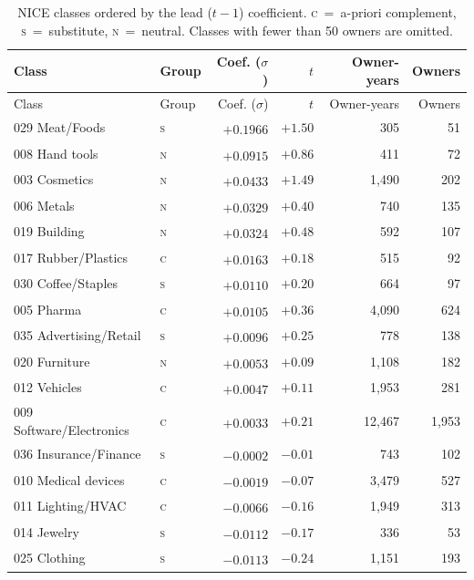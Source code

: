 \documentclass[11pt]{article}
\begin{document}
\begin{longtable}{llrrrr}
\caption{NICE classes ordered by the lead ($t-1$) coefficient. \textsc{c}~=~a-priori complement, \textsc{s}~=~substitute, \textsc{n}~=~neutral. Classes with fewer than 50 owners are omitted.}\label{tab:classes}\\\toprule
Class & Group & Coef. ($\sigma$) & $t$ & Owner-years & Owners \\\midrule
\endfirsthead\toprule Class & Group & Coef. ($\sigma$) & $t$ & Owner-years & Owners \\\midrule\endhead
029 Meat/Foods & \textsc{s} & $+0.1966$\textsuperscript{} & $+1.50$ & 305 & 51 \\
008 Hand tools & \textsc{n} & $+0.0915$\textsuperscript{} & $+0.86$ & 411 & 72 \\
003 Cosmetics & \textsc{n} & $+0.0433$\textsuperscript{} & $+1.49$ & 1,490 & 202 \\
006 Metals & \textsc{n} & $+0.0329$\textsuperscript{} & $+0.40$ & 740 & 135 \\
019 Building & \textsc{n} & $+0.0324$\textsuperscript{} & $+0.48$ & 592 & 107 \\
017 Rubber/Plastics & \textsc{c} & $+0.0163$\textsuperscript{} & $+0.18$ & 515 & 92 \\
030 Coffee/Staples & \textsc{s} & $+0.0110$\textsuperscript{} & $+0.20$ & 664 & 97 \\
005 Pharma & \textsc{c} & $+0.0105$\textsuperscript{} & $+0.36$ & 4,090 & 624 \\
035 Advertising/Retail & \textsc{s} & $+0.0096$\textsuperscript{} & $+0.25$ & 778 & 138 \\
020 Furniture & \textsc{n} & $+0.0053$\textsuperscript{} & $+0.09$ & 1,108 & 182 \\
012 Vehicles & \textsc{c} & $+0.0047$\textsuperscript{} & $+0.11$ & 1,953 & 281 \\
009 Software/Electronics & \textsc{c} & $+0.0033$\textsuperscript{} & $+0.21$ & 12,467 & 1,953 \\
036 Insurance/Finance & \textsc{s} & $-0.0002$\textsuperscript{} & $-0.01$ & 743 & 102 \\
010 Medical devices & \textsc{c} & $-0.0019$\textsuperscript{} & $-0.07$ & 3,479 & 527 \\
011 Lighting/HVAC & \textsc{c} & $-0.0066$\textsuperscript{} & $-0.16$ & 1,949 & 313 \\
014 Jewelry & \textsc{s} & $-0.0112$\textsuperscript{} & $-0.17$ & 336 & 53 \\
025 Clothing & \textsc{s} & $-0.0113$\textsuperscript{} & $-0.24$ & 1,151 & 193 \\

\end{longtable}
\end{document}

